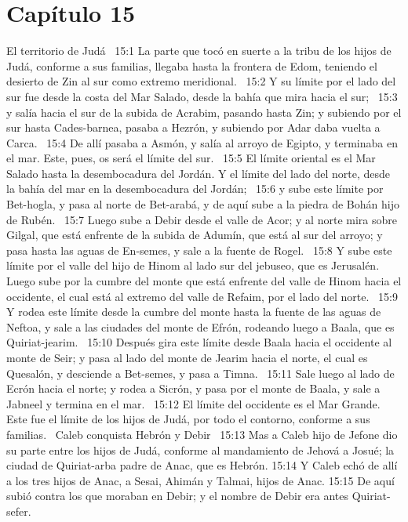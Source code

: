 \section*{Capítulo 15 }
El territorio de Judá  
15:1 La parte que tocó en suerte a la tribu de los hijos de Judá, conforme a sus familias, llegaba hasta la frontera de Edom, teniendo el desierto de Zin al sur como extremo meridional.  
15:2 Y su límite por el lado del sur fue desde la costa del Mar Salado, desde la bahía que mira hacia el sur;  
15:3 y salía hacia el sur de la subida de Acrabim, pasando hasta Zin; y subiendo por el sur hasta Cades-barnea, pasaba a Hezrón, y subiendo por Adar daba vuelta a Carca.  
15:4 De allí pasaba a Asmón, y salía al arroyo de Egipto, y terminaba en el mar. Este, pues, os será el límite del sur.  
15:5 El límite oriental es el Mar Salado hasta la desembocadura del Jordán. Y el límite del lado del norte, desde la bahía del mar en la desembocadura del Jordán;  
15:6 y sube este límite por Bet-hogla, y pasa al norte de Bet-arabá, y de aquí sube a la piedra de Bohán hijo de Rubén.  
15:7 Luego sube a Debir desde el valle de Acor; y al norte mira sobre Gilgal, que está enfrente de la subida de Adumín, que está al sur del arroyo; y pasa hasta las aguas de En-semes, y sale a la fuente de Rogel.  
15:8 Y sube este límite por el valle del hijo de Hinom al lado sur del jebuseo, que es Jerusalén. Luego sube por la cumbre del monte que está enfrente del valle de Hinom hacia el occidente, el cual está al extremo del valle de Refaim, por el lado del norte.  
15:9 Y rodea este límite desde la cumbre del monte hasta la fuente de las aguas de Neftoa, y sale a las ciudades del monte de Efrón, rodeando luego a Baala, que es Quiriat-jearim.  
15:10 Después gira este límite desde Baala hacia el occidente al monte de Seir; y pasa al lado del monte de Jearim hacia el norte, el cual es Quesalón, y desciende a Bet-semes, y pasa a Timna.  
15:11 Sale luego al lado de Ecrón hacia el norte; y rodea a Sicrón, y pasa por el monte de Baala, y sale a Jabneel y termina en el mar.  
15:12 El límite del occidente es el Mar Grande. Este fue el límite de los hijos de Judá, por todo el contorno, conforme a sus familias.  
Caleb conquista Hebrón y Debir   
15:13 Mas a Caleb hijo de Jefone dio su parte entre los hijos de Judá, conforme al mandamiento de Jehová a Josué; la ciudad de Quiriat-arba padre de Anac, que es Hebrón. 
15:14 Y Caleb echó de allí a los tres hijos de Anac, a Sesai, Ahimán y Talmai, hijos de Anac. 
15:15 De aquí subió contra los que moraban en Debir; y el nombre de Debir era antes Quiriat-sefer.  
